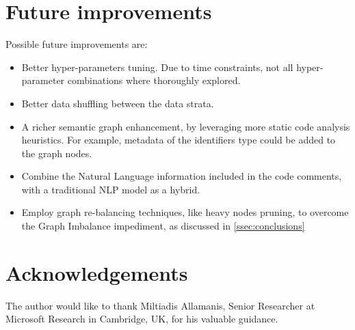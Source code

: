 \documentclass{article}
\begin{document}
\section{Future improvements}
Possible future improvements are: 
\begin{itemize}
  \item Better hyper-parameters tuning. Due to time constraints, not all hyper-parameter combinations where thoroughly explored.
  \item Better data shuffling between the data strata.
  \item A richer semantic graph enhancement, by leveraging more static code analysis heuristics. For example, metadata of the identifiers type could be added to the graph nodes.
  \item Combine the Natural Language information included in the code comments, with a traditional NLP model as a hybrid.
  \item Employ graph re-balancing techniques, like heavy nodes pruning, to overcome the Graph Imbalance impediment, as discussed in \autoref{ssec:conclusions}
\end{itemize}


\section*{Acknowledgements}
The author would like to thank Miltiadis Allamanis, Senior Researcher at Microsoft Research in Cambridge, UK, for his valuable guidance.

  
 
\end{document}

